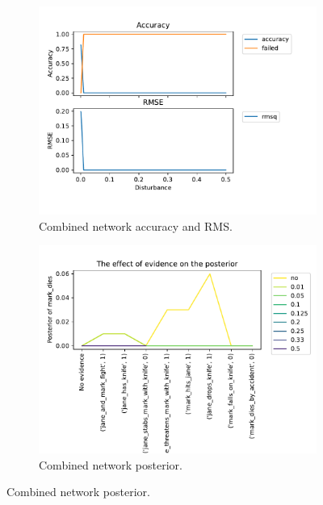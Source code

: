 \begin{enumerate}
\begin{figure}[htbp]
\begin{subfigure}{.5\textwidth}
\centering
\includegraphics[width=0.9\linewidth]{images/performance_KBFull.pdf}
\caption{Combined network accuracy and RMS.}
\label{fulla1}
\end{subfigure}%
\begin{subfigure}{.5\textwidth}
 \centering
\includegraphics[width=0.9\linewidth]{../experiments/VlekNetwork/plots/posterior_KBFull.pdf}
\caption{Combined network posterior.}
\label{fullp}
\end{subfigure}
\end{figure}


\end{enumerate}
